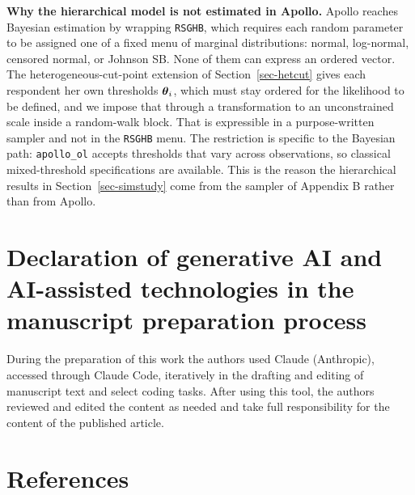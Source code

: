 \documentclass[
  letterpaper,
  DIV=11,
  numbers=noendperiod]{scrartcl}
\theoremstyle{plain}
\theoremstyle{plain}
\theoremstyle{remark}
\begin{document}
\textbf{Why the hierarchical model is not estimated in Apollo.} Apollo
reaches Bayesian estimation by wrapping \texttt{RSGHB}, which requires
each random parameter to be assigned one of a fixed menu of marginal
distributions: normal, log-normal, censored normal, or Johnson SB. None
of them can express an ordered vector. The heterogeneous-cut-point
extension of Section~\ref{sec-hetcut} gives each respondent her own
thresholds \(\boldsymbol{\theta}_i\), which must stay ordered for the likelihood to
be defined, and we impose that through a transformation to an
unconstrained scale inside a random-walk block. That is expressible in a
purpose-written sampler and not in the \texttt{RSGHB} menu. The
restriction is specific to the Bayesian path: \texttt{apollo\_ol}
accepts thresholds that vary across observations, so classical
mixed-threshold specifications are available. This is the reason the
hierarchical results in Section~\ref{sec-simstudy} come from the sampler
of Appendix B rather than from Apollo.

\section*{Declaration of generative AI and AI-assisted technologies in
the manuscript preparation
process}\label{declaration-of-generative-ai-and-ai-assisted-technologies-in-the-manuscript-preparation-process}

During the preparation of this work the authors used Claude (Anthropic),
accessed through Claude Code, iteratively in the drafting and editing of
manuscript text and select coding tasks. After using this tool, the
authors reviewed and edited the content as needed and take full
responsibility for the content of the published article.

\section*{References}\label{references}
\end{document}
